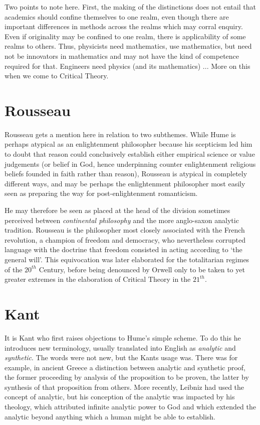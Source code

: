 \documentclass[10pt,titlepage]{article}
\begin{document}
Two points to note here.
First, the making of the distinctions does not entail that academics should confine themselves to one realm, even though there are important differences in methods across the realms which may corral enquiry.
Even if originality may be confined to one realm, there is applicability of some realms to others.
Thus, physicists need mathematics, use mathematics, but need not be innovators in mathematics and may not have the kind of competence required for that.
Engineers need physics (and its mathematics) ...
More on this when we come to Critical Theory.

\section{Rousseau}

Rousseau gets a mention here in relation to two subthemes.
While Hume is perhaps atypical as an enlightenment philosopher because his scepticism led him to doubt that reason could conclusively establish either empirical science or value judgements (or belief in God, hence underpinning counter enlightenment religious beliefs founded in faith rather than reason), Rousseau is atypical in completely different ways, and may be perhaps the enlightenment philosopher most easily seen as preparing the way for post-enlightenment romanticism.\cite{berlinRR}


He may therefore be seen as placed at the head of the division sometimes perceived between \emph{continental philosophy} and the more anglo-saxon analytic tradition.
Rousseau is the philosopher most closely associated with the French revolution, a champion of freedom and democracy, who nevertheless corrupted language with the doctrine that freedom consisted in acting according to `the general will'.
This equivocation was later elaborated for the totalitarian regimes of the $20^{th}$ Century, before being denounced by Orwell \cite{orwell-1984} only to be taken to yet greater extremes in the elaboration of Critical Theory in the $21^{th}$.


\section{Kant}

It is Kant who first raises objections to Hume's simple scheme.
To do this he introduces new terminology, usually translated into English as \emph{analytic} and \emph{synthetic}.
The words were not new, but the Kants usage was.
There was for example, in ancient Greece a distinction between analytic and synthetic proof, the former proceeding by analysis of the proposition to be proven, the latter by synthesis of that proposition from others.
More recently, Leibniz had used the concept of analytic, but his conception of the analytic was impacted by his theology, which attributed infinite analytic power to God and which extended the analytic beyond anything which a human might be able to establish.
\end{document}
